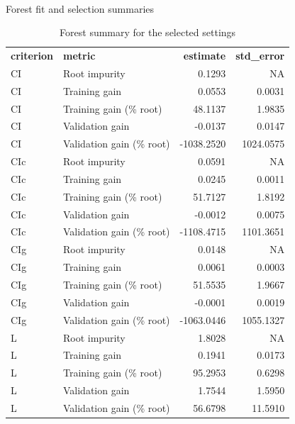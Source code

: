 \documentclass[
  11pt,
  a4paper,
]{article}
\makeatletter
\let\oldparagraph\paragraph
\renewcommand{\paragraph}{
    \@ifstar
      \xxxParagraphStar
      \xxxParagraphNoStar
  }
\newcommand{\xxxParagraphStar}[1]{\oldparagraph*{#1}\mbox{}}
\newcommand{\xxxParagraphNoStar}[1]{\oldparagraph{#1}\mbox{}}
\makeatother
\begin{document}
\endgroup{}

\paragraph{Forest fit and selection
summaries}\label{forest-fit-and-selection-summaries}

\begingroup\fontsize{11}{13}\selectfont

\begin{longtable}[t]{llrr}

\caption{\label{tbl-appendix-forest-selected-setting-summary}Forest
summary for the selected settings}

\tabularnewline

\\
\toprule
\textbf{criterion} & \textbf{metric} & \textbf{estimate} & \textbf{std\_error}\\
\midrule
CI & Root impurity & 0.1293 & NA\\
CI & Training gain & 0.0553 & 0.0031\\
CI & Training gain (\% root) & 48.1137 & 1.9835\\
CI & Validation gain & -0.0137 & 0.0147\\
CI & Validation gain (\% root) & -1038.2520 & 1024.0575\\
\addlinespace
CIc & Root impurity & 0.0591 & NA\\
CIc & Training gain & 0.0245 & 0.0011\\
CIc & Training gain (\% root) & 51.7127 & 1.8192\\
CIc & Validation gain & -0.0012 & 0.0075\\
CIc & Validation gain (\% root) & -1108.4715 & 1101.3651\\
\addlinespace
CIg & Root impurity & 0.0148 & NA\\
CIg & Training gain & 0.0061 & 0.0003\\
CIg & Training gain (\% root) & 51.5535 & 1.9667\\
CIg & Validation gain & -0.0001 & 0.0019\\
CIg & Validation gain (\% root) & -1063.0446 & 1055.1327\\
\addlinespace
L & Root impurity & 1.8028 & NA\\
L & Training gain & 0.1941 & 0.0173\\
L & Training gain (\% root) & 95.2953 & 0.6298\\
L & Validation gain & 1.7544 & 1.5950\\
L & Validation gain (\% root) & 56.6798 & 11.5910\\
\bottomrule

\end{longtable}
\end{document}
